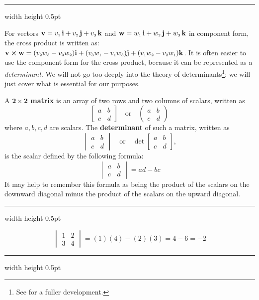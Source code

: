 \hrule width \textwidth height 0.5pt
\vspace{4mm}

For vectors $\textbf{v} = v_{\scriptscriptstyle 1}\,\textbf{i} + v_{\scriptscriptstyle 2}\,\textbf{j} + v_{\scriptscriptstyle 3}\,\textbf{k}$ and $\textbf{w} = w_{\scriptscriptstyle 1}\,\textbf{i} + w_{\scriptscriptstyle 2}\,\textbf{j} + w_{\scriptscriptstyle 3}\,\textbf{k}$ in component form, the cross
product is written as: $\textbf{v} \bm{\times} \textbf{w} = (v_{\scriptscriptstyle 2}w_{\scriptscriptstyle 3} -
v_{\scriptscriptstyle 3}w_{\scriptscriptstyle 2})\textbf{i} + (v_{\scriptscriptstyle 3}w_{\scriptscriptstyle 1} - v_{\scriptscriptstyle 1}w_{\scriptscriptstyle 3})\textbf{j} +
(v_{\scriptscriptstyle 1}w_{\scriptscriptstyle 2} - v_{\scriptscriptstyle 2}w_{\scriptscriptstyle 1})\textbf{k}$.
It is often easier to use the component form for the cross product, because it can be represented as a
\emph{determinant}. We will not go too deeply into the theory of determinants\footnote{See \cite{ar}
for a fuller development.}; we will just cover what is essential for our purposes.

A \textbf{$\bm{2 \times 2}$ matrix} is an array of two rows and two columns of scalars, written as
\begin{displaymath}
 \begin{bmatrix}
  a & b\\
  c & d
 \end{bmatrix}
 \quad\text{or}\quad
 \begin{pmatrix}
  a & b\\
  c & d
 \end{pmatrix}
\end{displaymath}
where $a, b, c, d$ are scalars. 
The \textbf{determinant} of such a matrix, written as
\begin{displaymath}
 \begin{vmatrix}
  a & b\\
  c & d
 \end{vmatrix}
 \quad\text{or}\quad
 \det \begin{bmatrix}
  a & b\\
  c & d
 \end{bmatrix},
\end{displaymath}
is the scalar defined by the following formula:
\begin{displaymath}
 \begin{vmatrix}
  a & b\\
  c & d
 \end{vmatrix}
 = ad - bc
\end{displaymath}
It may help to remember this formula as being the product of the scalars on the downward diagonal minus the product of
the scalars on the upward diagonal.

\vspace{3mm}
\hrule width \textwidth height 0.5pt
\begin{exmp}
 \begin{displaymath}
  \begin{vmatrix}
   1 & 2\\
   3 & 4
  \end{vmatrix}
  = (1)(4) - (2)(3) = 4 - 6 = -2
 \end{displaymath}
\end{exmp}
\hrule width \textwidth height 0.5pt
\vspace{3mm}

